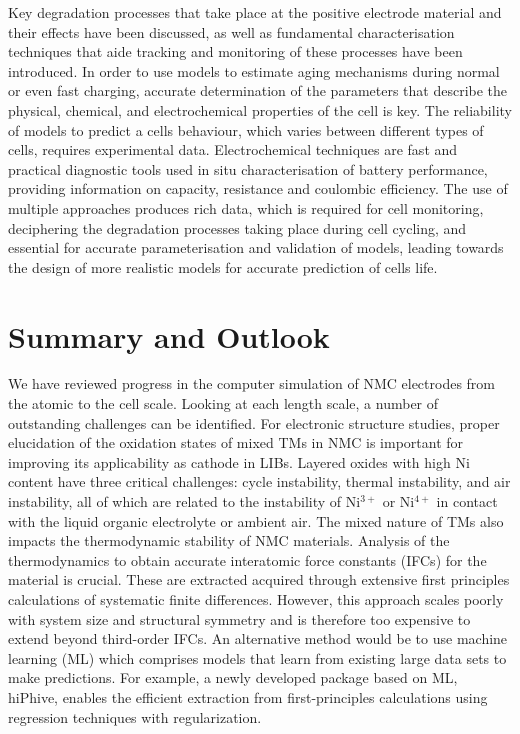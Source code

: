\documentclass[aps,prb,twocolumn,superscriptaddress,reprint]{revtex4-1}
\begin{document}
Key degradation processes that take place at the positive electrode material and their effects have been discussed, as well as fundamental characterisation techniques that aide tracking and monitoring of these processes have been introduced. In order to use models to estimate aging mechanisms during normal or even fast charging, accurate determination of the parameters that describe the physical, chemical, and electrochemical properties of the cell is key. The reliability of models to predict a cells behaviour, which varies between different types of cells, requires experimental data. Electrochemical techniques are fast and practical diagnostic tools used in situ characterisation of battery performance, providing information on capacity, resistance and coulombic efficiency. The use of multiple approaches produces rich data, which is required for cell monitoring, deciphering the degradation processes taking place during cell cycling, and essential for accurate parameterisation and validation of models, leading towards the design of more realistic models for accurate prediction of cells life.

\section*{Summary and Outlook}
We have reviewed progress in the computer simulation of NMC electrodes from the atomic to the cell scale. Looking at each length scale, a number of outstanding challenges can be identified.
For electronic structure studies, proper elucidation of the oxidation states of mixed TMs in NMC is important for improving its applicability as cathode in LIBs. Layered oxides with high Ni content have three critical challenges: cycle instability, thermal instability, and air instability, all of which are related to the instability of Ni$^{3+}$ or Ni$^{4+}$ in contact with the liquid organic electrolyte or ambient air.\cite{Manthiram-NatComm-2020} The mixed nature of TMs also impacts the thermodynamic stability of NMC materials. Analysis of the thermodynamics to obtain accurate interatomic force constants (IFCs) for the material is crucial. These are extracted acquired through extensive first principles calculations of systematic finite differences. However, this approach scales poorly with system size and structural symmetry and is therefore too expensive to extend beyond third-order IFCs. An alternative method would be to use machine learning (ML) which comprises models that learn from existing large data sets to make predictions. For example, a newly developed package based on ML, hiPhive, enables the efficient extraction from first-principles calculations using regression techniques with regularization.\cite{eriksson2019hiphive}
\end{document}

